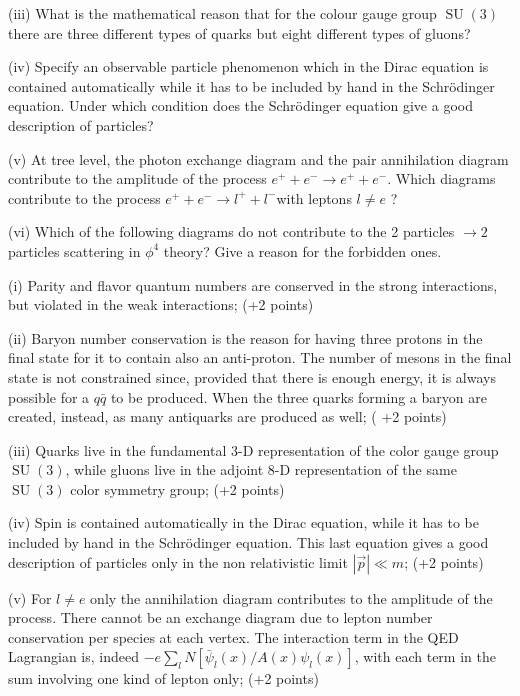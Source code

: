 \documentclass[10pt, letterpaper]{article}
\begin{document}
(iii) What is the mathematical reason that for the colour gauge group $\operatorname{SU}(3)$ there are three different types of quarks but eight different types of gluons?

(iv) Specify an observable particle phenomenon which in the Dirac equation is contained automatically while it has to be included by hand in the Schrödinger equation. Under which condition does the Schrödinger equation give a good description of particles?

(v) At tree level, the photon exchange diagram and the pair annihilation diagram contribute to the amplitude of the process $e^{+}+e^{-} \rightarrow e^{+}+e^{-}$. Which diagrams contribute to the process $e^{+}+e^{-} \rightarrow l^{+}+l^{-}$with leptons $l \neq e$ ?

(vi) Which of the following diagrams do not contribute to the 2 particles $\rightarrow 2$ particles scattering in $\phi^4$ theory? Give a reason for the forbidden ones.


(i) Parity and flavor quantum numbers are conserved in the strong interactions, but violated in the weak interactions; (+2 points)

(ii) Baryon number conservation is the reason for having three protons in the final state for it to contain also an anti-proton. The number of mesons in the final state is not constrained since, provided that there is enough energy, it is always possible for a $q \bar{q}$ to be produced. When the three quarks forming a baryon are created, instead, as many antiquarks are produced as well; ( +2 points)

(iii) Quarks live in the fundamental 3-D representation of the color gauge group $\operatorname{SU}(3)$, while gluons live in the adjoint 8-D representation of the same $\operatorname{SU}(3)$ color symmetry group; (+2 points)

(iv) Spin is contained automatically in the Dirac equation, while it has to be included by hand in the Schrödinger equation. This last equation gives a good description of particles only in the non relativistic limit $|\vec{p}| \ll m$; (+2 points)


(v) For $l \neq e$ only the annihilation diagram contributes to the amplitude of the process. There cannot be an exchange diagram due to lepton number conservation per species at each vertex. The interaction term in the QED Lagrangian is, indeed $-e \sum_l N\left[\bar{\psi}_l(x) / A(x) \psi_l(x)\right]$, with each term in the sum involving one kind of lepton only; (+2 points)
\end{document}

